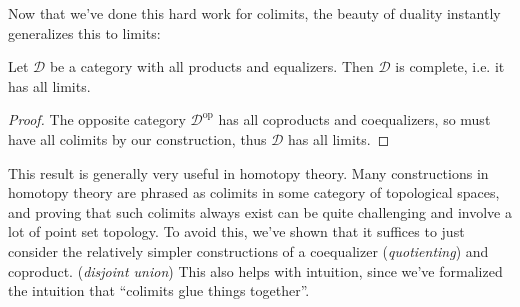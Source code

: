\begin{solution}
    Now that we've done this hard work for colimits, the beauty of duality instantly generalizes this to limits:
    \begin{claim}
        Let $\mathscr{D}$ be a category with all products and equalizers. Then $\mathscr{D}$ is complete, i.e. it has all limits.
    \end{claim}
    \begin{proof}
        The opposite category $\mathscr{D}^{\textrm{op}}$ has all coproducts and coequalizers, so must have all colimits by our construction, thus $\mathscr{D}$ has all limits.
    \end{proof}

    This result is generally very useful in homotopy theory. Many constructions in homotopy theory are phrased as colimits in some category of topological spaces, and proving that such colimits always exist can be quite challenging and involve a lot of point set topology. To avoid this, we've shown that it suffices to just consider the relatively simpler constructions of a coequalizer (\emph{quotienting}) and coproduct. (\emph{disjoint union}) This also helps with intuition, since we've formalized the intuition that ``colimits glue things together''.
\end{solution}
